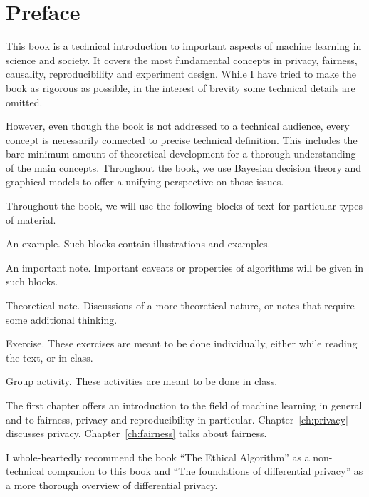 \chapter*{Preface}

This book is a technical introduction to important aspects of machine learning in science and society. It covers the most fundamental concepts in privacy, fairness, causality, reproducibility and experiment design. While I have tried to make the book as rigorous as possible, in the interest of brevity some technical details are omitted. 

However, even though the book is not addressed to a technical audience, every concept is necessarily connected to precise technical definition. This includes the bare minimum amount of theoretical development for a thorough understanding of the main concepts. Throughout the book, we use Bayesian decision theory and graphical models to offer a unifying perspective on those issues.


Throughout the book, we will use the following blocks of text for particular types of material.
\begin{exampleblock}{An example.}
Such blocks contain illustrations and examples. 
\end{exampleblock}

\begin{alertblock}{An important note.}
Important caveats or properties of algorithms will be given in such blocks.
\end{alertblock}

\begin{theoryblock}{Theoretical note.}
Discussions of a more theoretical nature, or notes that require some additional thinking.
\end{theoryblock}

\begin{exerciseblock}{Exercise.}
  These exercises are meant to be done individually, either while reading the text, or in class.
\end{exerciseblock}

\begin{groupactivity}{Group activity.}
  These activities are meant to be done in class.
\end{groupactivity}

The first chapter offers an introduction to the field of machine learning in general and to fairness, privacy and reproducibility in particular. Chapter~\ref{ch:privacy} discusses privacy. Chapter~\ref{ch:fairness} talks about fairness.

I whole-heartedly recommend the book ``The Ethical Algorithm'' as a non-technical companion to this book and ``The foundations of differential privacy'' as a more thorough overview of differential privacy.

